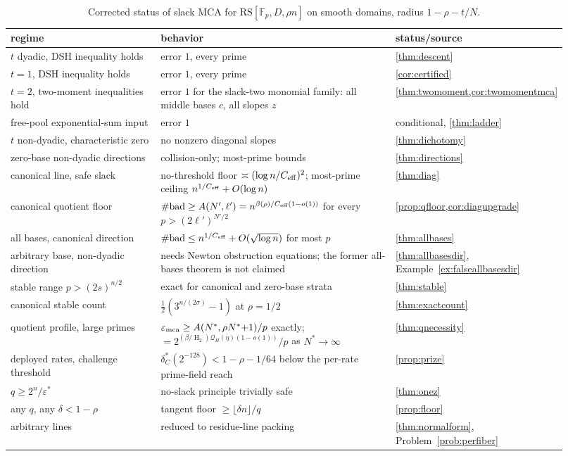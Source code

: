 \documentclass[11pt]{article}
\theoremstyle{definition}
\newcommand{\F}{\mathbb F}
\newcommand{\eps}{\varepsilon}
\newcommand{\HH}{\operatorname{H}_2}
\newcommand{\RS}{\mathrm{RS}}
\newcommand{\emca}{\eps_{\rm mca}}
\newcommand{\ceff}{C_{\rm eff}}
\newcommand{\Acl}{A}
\begin{document}
\begin{table}[ht]\centering\small
\caption{Corrected status of slack MCA for $\RS[\F_p,D,\rho n]$ on smooth domains, radius $1-\rho-t/N$.}\label{tab:frontier}
\begin{tabular}{p{0.29\linewidth}p{0.43\linewidth}p{0.20\linewidth}}
\toprule
regime & behavior & status/source\\
\midrule
$t$ dyadic, DSH inequality holds & error $1$, every prime & \cref{thm:descent}\\
$t=1$, DSH inequality holds & error $1$, every prime & \cref{cor:certified}\\
$t=2$, two-moment inequalities hold & error $1$ for the slack-two monomial family: all middle bases $c$, all slopes $z$ & \cref{thm:twomoment,cor:twomomentmca}\\
free-pool exponential-sum input & error $1$ & conditional, \cref{thm:ladder}\\
$t$ non-dyadic, characteristic zero & no nonzero diagonal slopes & \cref{thm:dichotomy}\\
zero-base non-dyadic directions & collision-only; most-prime bounds & \cref{thm:directions}\\
canonical line, safe slack & no-threshold floor $\asymp(\log n/\ceff)^2$; most-prime ceiling $n^{1/\ceff}+O(\log n)$ & \cref{thm:diag}\\
canonical quotient floor & $\#\mathrm{bad}\ge A(N',\ell')=n^{\beta(\rho)/\ceff(1-o(1))}$ for every $p>(2\ell')^{N'/2}$ & \cref{prop:qfloor,cor:diagupgrade}\\
all bases, canonical direction & $\#\mathrm{bad}\le n^{1/\ceff}+O(\sqrt{\log n})$ for most $p$ & \cref{thm:allbases}\\
arbitrary base, non-dyadic direction & needs Newton obstruction equations; the former all-bases theorem is not claimed & \cref{thm:allbasesdir}, Example~\ref{ex:falseallbasesdir}\\
stable range $p>(2s)^{n/2}$ & exact for canonical and zero-base strata & \cref{thm:stable}\\
canonical stable count & $\tfrac12(3^{n/(2\sigma)}-1)$ at $\rho=1/2$ & \cref{thm:exactcount}\\
quotient profile, large primes & $\emca\ge\Acl(N^*,\rho N^*{+}1)/p$ exactly; $=2^{(\beta/\HH)\mathcal Q_H(\eta)(1-o(1))}/p$ as $N^*\to\infty$ & \cref{thm:qnecessity}\\
deployed rates, challenge threshold & $\delta_C^*(2^{-128})<1-\rho-1/64$ below the per-rate prime-field reach & \cref{prop:prize}\\
$q\ge2^n/\eps^*$ & no-slack principle trivially safe & \cref{thm:onez}\\
any $q$, any $\delta<1-\rho$ & tangent floor $\ge\lfloor\delta n\rfloor/q$ & \cref{prop:floor}\\
arbitrary lines & reduced to residue-line packing & \cref{thm:normalform}, Problem~\ref{prob:perfiber}\\
\bottomrule
\end{tabular}
\end{table}
\end{document}
